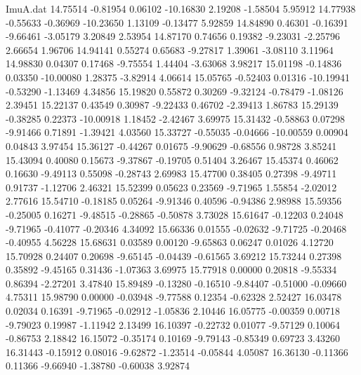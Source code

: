 \begin{filecontents}{ImuA.dat}
  14.75514   -0.81954    0.06102  -10.16830    2.19208   -1.58504    5.95912
  14.77938   -0.55633   -0.36969  -10.23650    1.13109   -0.13477    5.92859
  14.84890    0.46301   -0.16391   -9.66461   -3.05179    3.20849    2.53954
  14.87170    0.74656    0.19382   -9.23031   -2.25796    2.66654    1.96706
  14.94141    0.55274    0.65683   -9.27817    1.39061   -3.08110    3.11964
  14.98830    0.04307    0.17468   -9.75554    1.44404   -3.63068    3.98217
  15.01198   -0.14836    0.03350  -10.00080    1.28375   -3.82914    4.06614
  15.05765   -0.52403    0.01316  -10.19941   -0.53290   -1.13469    4.34856
  15.19820    0.55872    0.30269   -9.32124   -0.78479   -1.08126    2.39451
  15.22137    0.43549    0.30987   -9.22433    0.46702   -2.39413    1.86783
  15.29139   -0.38285    0.22373  -10.00918    1.18452   -2.42467    3.69975
  15.31432   -0.58863    0.07298   -9.91466    0.71891   -1.39421    4.03560
  15.33727   -0.55035   -0.04666  -10.00559    0.00904    0.04843    3.97454
  15.36127   -0.44267    0.01675   -9.90629   -0.68556    0.98728    3.85241
  15.43094    0.40080    0.15673   -9.37867   -0.19705    0.51404    3.26467
  15.45374    0.46062    0.16630   -9.49113    0.55098   -0.28743    2.69983
  15.47700    0.38405    0.27398   -9.49711    0.91737   -1.12706    2.46321
  15.52399    0.05623    0.23569   -9.71965    1.55854   -2.02012    2.77616
  15.54710   -0.18185    0.05264   -9.91346    0.40596   -0.94386    2.98988
  15.59356   -0.25005    0.16271   -9.48515   -0.28865   -0.50878    3.73028
  15.61647   -0.12203    0.24048   -9.71965   -0.41077   -0.20346    4.34092
  15.66336    0.01555   -0.02632   -9.71725   -0.20468   -0.40955    4.56228
  15.68631    0.03589    0.00120   -9.65863    0.06247    0.01026    4.12720
  15.70928    0.24407    0.20698   -9.65145   -0.04439   -0.61565    3.69212
  15.73244    0.27398    0.35892   -9.45165    0.31436   -1.07363    3.69975
  15.77918    0.00000    0.20818   -9.55334    0.86394   -2.27201    3.47840
  15.89489   -0.13280   -0.16510   -9.84407   -0.51000   -0.09660    4.75311
  15.98790    0.00000   -0.03948   -9.77588    0.12354   -0.62328    2.52427
  16.03478    0.02034    0.16391   -9.71965   -0.02912   -1.05836    2.10446
  16.05775   -0.00359    0.00718   -9.79023    0.19987   -1.11942    2.13499
  16.10397   -0.22732    0.01077   -9.57129    0.10064   -0.86753    2.18842
  16.15072   -0.35174    0.10169   -9.79143   -0.85349    0.69723    3.43260
  16.31443   -0.15912    0.08016   -9.62872   -1.23514   -0.05844    4.05087
  16.36130   -0.11366    0.11366   -9.66940   -1.38780   -0.60038    3.92874

\end{filecontents}

